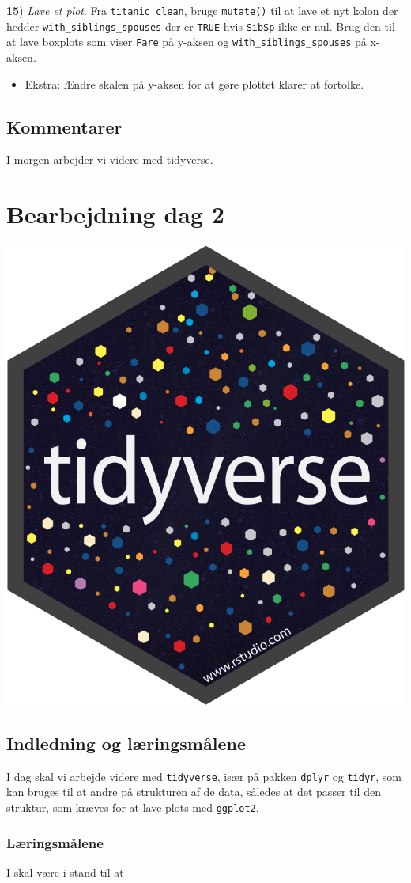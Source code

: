 \documentclass[
]{book}
\providecommand{\tightlist}{%
  \setlength{\itemsep}{0pt}\setlength{\parskip}{0pt}}
\begin{document}
\textbf{15}) \emph{Lave et plot}. Fra \texttt{titanic\_clean}, bruge \texttt{mutate()} til at lave et nyt kolon der hedder \texttt{with\_siblings\_spouses} der er \texttt{TRUE} hvis \texttt{SibSp} ikke er nul. Brug den til at lave boxplots som viser \texttt{Fare} på y-aksen og \texttt{with\_siblings\_spouses} på x-aksen.

\begin{itemize}
\tightlist
\item
  Ekstra: Ændre skalen på y-aksen for at gøre plottet klarer at fortolke.
\end{itemize}

\hypertarget{kommentarer}{%
\section{Kommentarer}\label{kommentarer}}

I morgen arbejder vi videre med tidyverse.

\hypertarget{bearbejdning-dag-2}{%
\chapter{Bearbejdning dag 2}\label{bearbejdning-dag-2}}

\includegraphics[width=0.15\linewidth]{plots/hex-tidyverse}

\hypertarget{indledning-og-luxe6ringsmuxe5lene}{%
\section{Indledning og læringsmålene}\label{indledning-og-luxe6ringsmuxe5lene}}

I dag skal vi arbejde videre med \texttt{tidyverse}, især på pakken \texttt{dplyr} og \texttt{tidyr}, som kan bruges til at andre på strukturen af de data, således at det passer til den struktur, som kræves for at lave plots med \texttt{ggplot2}.

\hypertarget{luxe6ringsmuxe5lene-1}{%
\subsection{Læringsmålene}\label{luxe6ringsmuxe5lene-1}}

I skal være i stand til at
\end{document}
